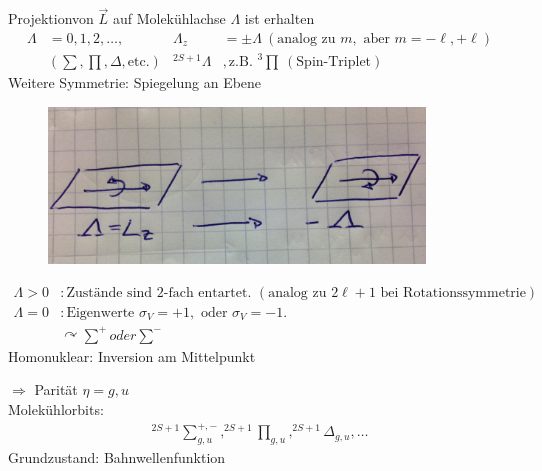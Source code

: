 Projektionvon $\vec{L}$ auf Molekühlachse $\Lambda$ ist erhalten
	\begin{align*}
		\Lambda &= 0, 1, 2, \ldots ,&
		\Lambda_z &= \pm \Lambda ~(\text{analog zu } m, \text{ aber } m = -\ell, +\ell) \\
		&\left(\sum, \prod, \Delta, \text{etc.}\right)
		& ^{2S + 1}\Lambda &, \text{z.B. } ^3 \prod ~(\text{Spin-Triplet}) 
	\end{align*}
Weitere Symmetrie: Spiegelung an Ebene
	\begin{figure} [h]
		\begin{center}
			\includegraphics[width=10cm]{Homonukleare_Molekuele2}
		\end{center}
	\end{figure}
	\begin{align*}
		\Lambda > 0 &: \text{Zustände sind 2-fach entartet. } (\text{analog zu } 2 \ell + 1 \text{ bei Rotationssymmetrie}) \\
		\Lambda = 0 &: \text{Eigenwerte } \sigma_V = + 1, \text{ oder } \sigma_V = -1.\\
		&\curvearrowright {\sum}^+ oder {\sum}^-
	\end{align*}
Homonuklear: Inversion am Mittelpunkt
	
$\Rightarrow$ Parität $\eta = g, u$ 
\\
Molekühlorbits:
	\begin{align*}
		^{2 S + 1}{\sum}_{g, u}^{+ , -} , ^{2 S + 1} {\prod}_{g, u}, ^{2 S + 1}\Delta_{g, u}, \ldots
	\end{align*}
Grundzustand: Bahnwellenfunktion 

